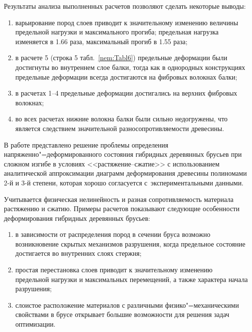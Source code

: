 Результаты анализа выполненных расчетов позволяют сделать некоторые выводы:

\begin{enumerate} 

\item варьирование пород слоев приводит к значительному изменению величины предельной нагрузки и максимального прогиба; предельная нагрузка изменяется в 1.66 раза, максимальный прогиб в 1.55 раза;

\item в расчете 5 (строка 5 табл.~\ref{nem:Tabl6}) предельные деформации были достигнуты во внутреннем слое балки, тогда как в однородных конструкциях предельные деформации всегда достигаются на фибровых волокнах балки;

\item в расчетах 1--4 предельные деформации достигались на верхних фибровых волокнах;

\item во всех расчетах нижние волокна балки были сильно недогружены, что является следствием значительной разносопротивляемости древесины.

\end{enumerate}



\smallskip



 В работе представлено решение проблемы определения напряженно"=деформированного состояния гибридных деревянных брусьев при сложном изгибе в условиях <<растяжение--сжатие>> с использованием аналитической аппроксимации диаграмм деформирования древесины полиномами 2-й и 3-й степени, которая хорошо согласуется с~экспериментальными данными.

Учитывается физическая нелинейность и разная сопротивляемость материала растяжению и сжатию. Примеры расчетов показывают следующие особенности деформирования гибридных деревянных брусьев:



\begin{enumerate}

\item в зависимости от распределения пород в сечении бруса возможно возникновение скрытых механизмов разрушения, когда предельное состояние достигается во внутренних слоях стержня;

\item простая перестановка слоев приводит к значительному изменению предельной нагрузки и максимальных перемещений, а также характера начала разрушения;

\item слоистое расположение материалов с различными физико"=механическими свойствами в брусе открывает  большие возможности для решения задач оптимизации.

\end{enumerate}



